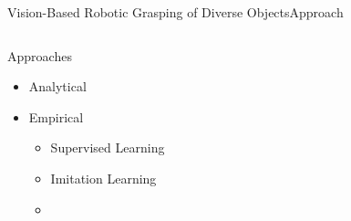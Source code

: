 \begin{frame}{Vision-Based Robotic Grasping of Diverse Objects}{Approach}
    \begin{columns}%
        \begin{column}{0.375\textwidth}%
            \begin{block}{Approaches}
                \begin{itemize}
                    \item Analytical
                    \item Empirical
                          \begin{itemize}
                              \item Supervised Learning
                              \item Imitation Learning
                              \item {}
                          \end{itemize}
                \end{itemize}
            \end{block}
        \end{column}
        \begin{column}{0.625\textwidth}%
            \centering
        \end{column}
    \end{columns}
\end{frame}

